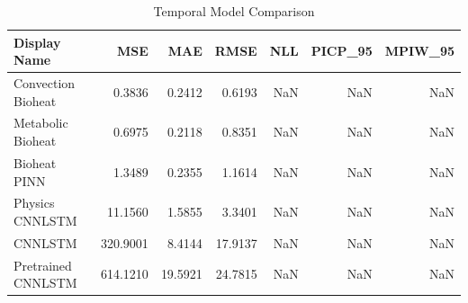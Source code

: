 \begin{table}
\caption{Temporal Model Comparison}
\begin{tabular}{lrrrrrr}
\toprule
Display Name & MSE & MAE & RMSE & NLL & PICP_95 & MPIW_95 \\
\midrule
Convection Bioheat & 0.3836 & 0.2412 & 0.6193 & NaN & NaN & NaN \\
Metabolic Bioheat & 0.6975 & 0.2118 & 0.8351 & NaN & NaN & NaN \\
Bioheat PINN & 1.3489 & 0.2355 & 1.1614 & NaN & NaN & NaN \\
Physics CNNLSTM & 11.1560 & 1.5855 & 3.3401 & NaN & NaN & NaN \\
CNNLSTM & 320.9001 & 8.4144 & 17.9137 & NaN & NaN & NaN \\
Pretrained CNNLSTM & 614.1210 & 19.5921 & 24.7815 & NaN & NaN & NaN \\
\bottomrule
\end{tabular}
\end{table}
